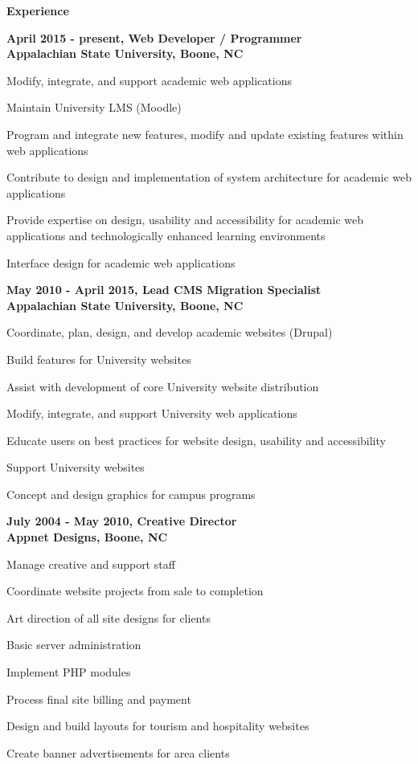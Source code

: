 \documentclass[a4paper,12pt,final]{memoir}
\newcommand{\SmallSep}{\vspace{0.5em}}
\newcommand{\CVSection}[1]
	{\Large\textbf{#1}\par
	\SmallSep\normalsize\normalfont}
\newcommand{\CVItem}[1]
	{\textbf{\color{BrickRed} #1}}
\begin{document}
\CVSection{Experience}
\CVItem{April 2015 - present, Web Developer / Programmer\\
Appalachian State University, Boone, NC}
\begin{compactitem}[\color{BrickRed}$\circ$]
	\item Modify, integrate, and support academic web applications
	\item Maintain University LMS (Moodle)
	\item Program and integrate new features, modify and update existing features within web applications
	\item Contribute to design and implementation of system architecture for academic web applications
	\item Provide expertise on design, usability and accessibility for academic web applications and technologically enhanced learning environments
	\item Interface design for academic web applications
\end{compactitem}
\SmallSep

\CVItem{May 2010 - April 2015, Lead CMS Migration Specialist\\
Appalachian State University, Boone, NC}
\begin{compactitem}[\color{BrickRed}$\circ$]
	\item Coordinate, plan, design, and develop academic websites (Drupal)
	\item Build features for University websites
	\item Assist with development of core University website distribution
	\item Modify, integrate, and support University web applications
	\item Educate users on best practices for website design, usability and accessibility
	\item Support University websites
	\item Concept and design graphics for campus programs
\end{compactitem}
\SmallSep

\clearpage
\framebreak
\framebreak

\CVItem{July 2004 - May 2010, Creative Director\\
Appnet Designs, Boone, NC}
\begin{compactitem}[\color{BrickRed}$\circ$]
	\item Manage creative and support staff
	\item Coordinate website projects from sale to completion
	\item Art direction of all site designs for clients
	\item Basic server administration
	\item Implement PHP modules
	\item Process final site billing and payment
	\item Design and build layouts for tourism and hospitality websites
	\item Create banner advertisements for area clients
\end{compactitem}
\SmallSep
\end{document}
